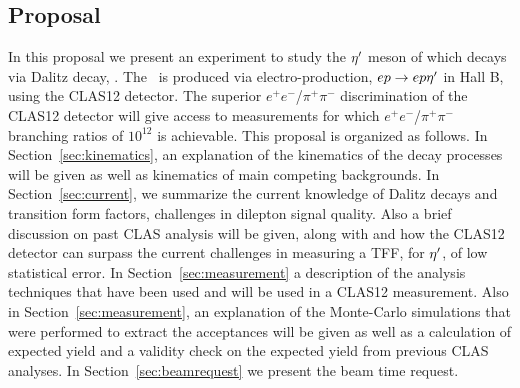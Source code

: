\subsection{Proposal}
\indent In this proposal we present an experiment to study the $\eta^{\prime}$ meson of which decays via Dalitz decay, \etaDal. The \etaT \ is produced via electro-production, $ep \rightarrow ep\eta^{\prime}$ in Hall B, using the CLAS12 detector. The superior $e^+e^-$/$\pi^+\pi^-$ discrimination of the CLAS12 detector will give access to measurements for which  $e^+e^-$/$\pi^+\pi^-$ branching ratios of $10^{12}$ is achievable.
This proposal is organized as follows. In Section~\ref{sec:kinematics}, an explanation of the kinematics of the decay processes will be given as well as kinematics of main competing backgrounds. In Section~\ref{sec:current}, we summarize the current knowledge of Dalitz decays and transition form factors, challenges in dilepton signal quality. Also a brief discussion on past CLAS analysis will be given, along with and how the CLAS12 detector can surpass the current challenges in measuring a TFF, for $\eta^{\prime}$, of low statistical error. In Section~\ref{sec:measurement} a description of the analysis techniques that have been used and will be used in a CLAS12 measurement. Also in Section~\ref{sec:measurement}, an explanation of the Monte-Carlo simulations that were performed to extract the acceptances will be given as well as a calculation of expected yield and a validity check on the expected yield from previous CLAS analyses. In Section~\ref{sec:beamrequest} we present the beam time request.



